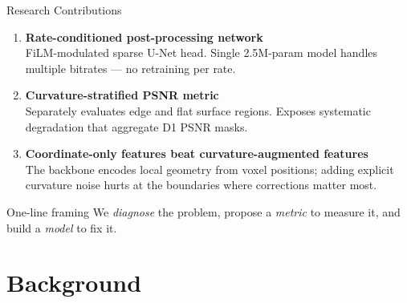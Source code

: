 \documentclass[aspectratio=169]{beamer}
\begin{document}
\begin{frame}{Research Contributions}
  \begin{enumerate}
    \item \textbf{Rate-conditioned post-processing network}\\
          FiLM-modulated sparse U-Net head. Single 2.5M-param model handles
          multiple bitrates — no retraining per rate.

    \vspace{8pt}
    \item \textbf{Curvature-stratified PSNR metric}\\
          Separately evaluates edge and flat surface regions. Exposes systematic
          degradation that aggregate D1 PSNR masks.

    \vspace{8pt}
    \item \textbf{Coordinate-only features beat curvature-augmented features}\\
          The backbone encodes local geometry from voxel positions; adding
          explicit curvature noise hurts at the boundaries where corrections
          matter most.
  \end{enumerate}

  \vspace{8pt}
  \begin{alertblock}{One-line framing}
    We \emph{diagnose} the problem, propose a \emph{metric} to measure it,
    and build a \emph{model} to fix it.
  \end{alertblock}
\end{frame}

\section{Background}
\end{document}
